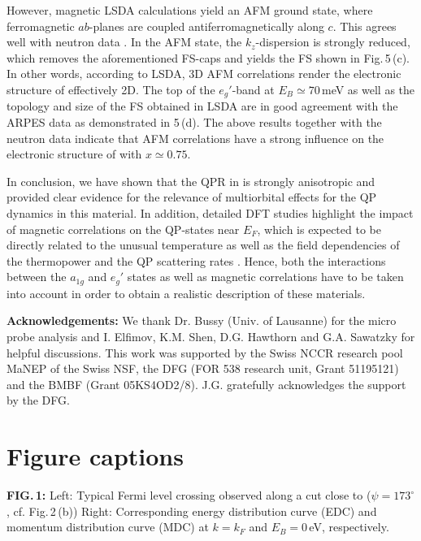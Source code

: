 \documentclass[preprint,showpacs,preprintnumbers,amsmath,amssymb,twoside,aps]{revtex4}
\begin{document}
However, magnetic LSDA calculations yield an AFM ground state, where ferromagnetic $ab$-planes are coupled antiferromagnetically along $c$. This
agrees well with neutron data \cite{HelmePRL05}. In the AFM state, the $k_z$-dispersion is strongly reduced, which removes the aforementioned FS-caps
and yields the FS shown in Fig.\,5\,(c). In other words, according to LSDA, 3D AFM correlations
render the electronic structure of \NCOc\/ effectively 2D. The top of the $e_g'$-band at $E_B\simeq 70$\,meV as well as the topology and size of the
FS obtained in LSDA are in good agreement with the ARPES data as demonstrated in 5\,(d). The above results together with the neutron data indicate
that AFM correlations have a strong influence on the electronic structure of \NCOx\/ with $x\simeq0.75$.

In conclusion, we have shown that the QPR in \NCO \/ is strongly anisotropic and provided clear evidence for the relevance of multiorbital effects
for the QP dynamics in this material. In addition, detailed DFT studies highlight the impact of magnetic correlations on the QP-states near $E_F$,
which is expected to be directly related to the unusual temperature as well as the field dependencies of the thermopower and the QP scattering rates
\cite{WangNature03,LiPRL04,HasanPRL04}.  Hence, both the interactions between the $a_{1g}$ and $e_g'$ states as well as magnetic correlations have to
be taken into account in order to obtain a realistic description of these materials.




{\bf Acknowledgements:} We thank Dr. Bussy (Univ. of Lausanne) for the micro probe analysis and  I. Elfimov, K.M. Shen, D.G. Hawthorn and G.A.
Sawatzky for helpful discussions. This work was supported by the Swiss NCCR research pool MaNEP of the Swiss NSF, the DFG (FOR 538 research unit,
Grant 51195121) and the BMBF (Grant 05KS4OD2/8). J.G. gratefully acknowledges the support by the DFG.

\section*{\large Figure captions}

{\bf FIG.\,1:} Left: Typical Fermi level crossing observed along a cut close to \GM\/ ($\psi=173^{\circ}$, cf. Fig.\,2\,(b))
Right: Corresponding energy distribution curve (EDC) and momentum distribution curve (MDC) at $k=k_F$ and $E_B=0$\,eV, respectively.
\end{document}
